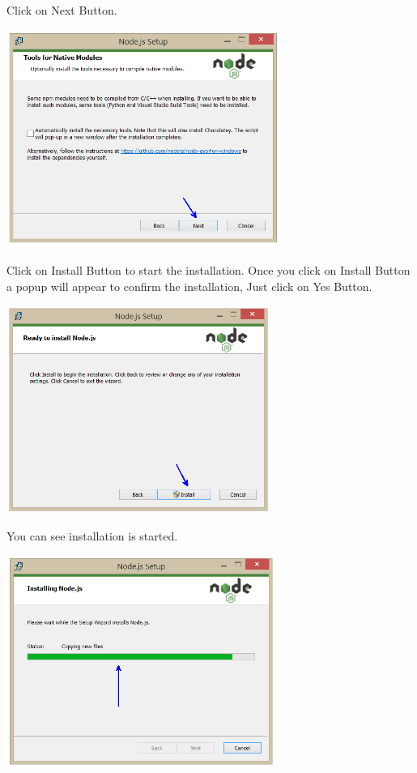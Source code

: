 \documentclass{article}
\begin{document}
\noindent 

\noindent 

 
   Click on Next Button.
 

\begin{center}
	\noindent \includegraphics*[width=3.51in, height=2.80in]{IMG-06-12}
\end{center}

\noindent 

 
   Click on Install Button to start the installation. Once you click on Install Button a popup will appear to confirm the installation, Just click on Yes Button.
 

\begin{center}
	\noindent \includegraphics*[width=3.39in, height=2.67in]{IMG-06-13}
\end{center}

\noindent 

 \newpage
\noindent You can see installation is started.
 

\begin{center}
	\noindent \includegraphics*[width=3.44in, height=2.71in]{IMG-06-14}
\end{center}
\end{document}
